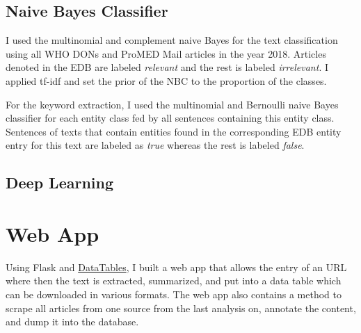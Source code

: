 \subsection{Naive Bayes Classifier}
I used the multinomial and complement naive Bayes for the text classification using all WHO DONs and ProMED Mail articles in the year 2018. Articles denoted in the EDB are labeled \emph{relevant} and the rest is labeled \emph{irrelevant}. I applied tf-idf and set the prior of the NBC to  the proportion of the classes.

 For the keyword extraction, I used the multinomial and Bernoulli naive Bayes classifier for each entity class fed by all sentences containing this entity class. Sentences of texts that contain entities found in the corresponding EDB entity entry for this text are labeled as \emph{true} whereas the rest is labeled \emph{false}.

\subsection{Deep Learning}

\section{Web App}
Using Flask and \href{https://www.datatables.net}{DataTables}, I built a web app that allows the entry of an URL where then the text is extracted, summarized, and put into a data table which can be downloaded in various formats.
The web app also contains a method to scrape all articles from one source from the last analysis on, annotate the content, and dump it into the database.
